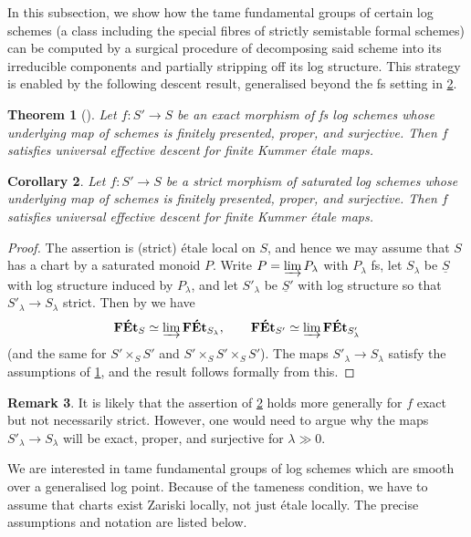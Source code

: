 \documentclass[a4paper,twoside,11pt,reqno]{amsart}
\newcommand{\cat}[1]{\mathbf{#1}}
\newcommand{\FEt}{\cat{F\acute{E}t}}
\newtheorem{thm}{Theorem}[subsection]
\newtheorem{cor}[thm]{Corollary}
\theoremstyle{definition}
\newtheorem{rmk}[thm]{Remark}
\numberwithin{equation}{subsection}
\begin{document}
In this subsection, we show how the tame fundamental groups of certain log schemes (a class including the special fibres of strictly semistable formal schemes) can be computed by a surgical procedure of decomposing said scheme into its irreducible components and partially stripping off its log structure. This strategy is enabled by the following descent result, generalised beyond the fs setting in \cref{cor:descent-beyond-fs}.

\begin{thm}[{\cite[Theorem~3.2.25]{Stix2002:Thesis}}] \label{thm:Stix-descent}
    Let $f\colon S'\to S$ be an exact morphism of fs log schemes whose underlying map of schemes is finitely presented, proper, and surjective. Then $f$ satisfies universal effective descent for finite Kummer \'etale maps. 
\end{thm}

\begin{cor} \label{cor:descent-beyond-fs}
    Let $f\colon S'\to S$ be a strict morphism of saturated log schemes whose underlying map of schemes is finitely presented, proper, and surjective. Then $f$ satisfies universal effective descent for finite Kummer \'etale maps.
\end{cor}

\begin{proof}
The assertion is (strict) \'etale local on $S$, and hence we may assume that $S$ has a chart by a saturated monoid $P$. Write $P=\varinjlim P_\lambda$ with $P_\lambda$ fs, let $S_\lambda$ be $\underline{S}$ with log structure induced by $P_\lambda$, and let $S'_\lambda$ be $\underline{S}'$ with log structure so that $S'_\lambda\to S_\lambda$ strict. Then by \cite[Proposition~4.2.6]{AHLS-Log} we have
\[
    \FEt_S \simeq \varinjlim \FEt_{S_\lambda}, \qquad \FEt_{S'} \simeq \varinjlim \FEt_{S'_\lambda}
\]
(and the same for $S'\times_S S'$ and $S'\times_S S'\times_S S'$). The maps $S'_\lambda \to S_\lambda$ satisfy the assumptions of \cref{thm:Stix-descent}, and the result follows formally from this. 
\end{proof}

\begin{rmk}
    It is likely that the assertion of \cref{cor:descent-beyond-fs} holds more generally for $f$ exact but not necessarily strict. However, one would need to argue why the maps $S'_\lambda\to S_\lambda$ will be exact, proper, and surjective for $\lambda\gg 0$.
\end{rmk}

We are interested in tame fundamental groups of log schemes which are smooth over a generalised log point. Because of the tameness condition, we have to assume that charts exist Zariski locally, not just \'etale locally. The precise assumptions and notation are listed below.
\end{document}
